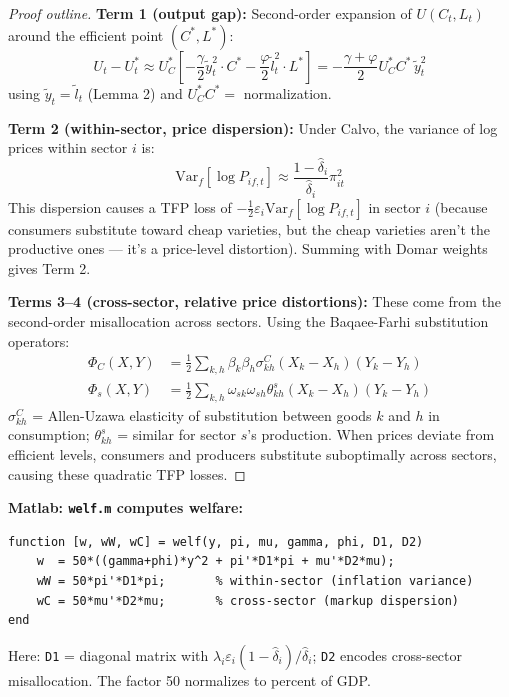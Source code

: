 \documentclass[12pt]{article}
\begin{document}
\begin{proof}[Proof outline]
\textbf{Term 1 (output gap):} Second-order expansion of $U(C_t, L_t)$ around the efficient point $(C^*, L^*)$:
\begin{equation}
    U_t - U_t^* \approx U_C^* \left[-\frac{\gamma}{2}\tilde{y}_t^2 \cdot C^* - \frac{\varphi}{2}\tilde{l}_t^2 \cdot L^*\right] = -\frac{\gamma+\varphi}{2}U_C^* C^*\,\tilde{y}_t^2
\end{equation}
using $\tilde{y}_t = \tilde{l}_t$ (Lemma 2) and $U_C^*C^* = $ normalization.

\textbf{Term 2 (within-sector, price dispersion):} Under Calvo, the variance of log prices within sector $i$ is:
\begin{equation}
    \mathrm{Var}_f[\log P_{if,t}] \approx \frac{1-\hat{\delta}_i}{\hat{\delta}_i}\pi_{it}^2
\end{equation}
This dispersion causes a TFP loss of $-\frac{1}{2}\varepsilon_i \mathrm{Var}_f[\log P_{if,t}]$ in sector $i$ (because consumers substitute toward cheap varieties, but the cheap varieties aren't the productive ones — it's a price-level distortion). Summing with Domar weights gives Term 2.

\textbf{Terms 3--4 (cross-sector, relative price distortions):} These come from the second-order misallocation across sectors. Using the Baqaee-Farhi substitution operators:
\begin{align}
    \Phi_C(X,Y) &= \frac{1}{2}\sum_{k,h}\beta_k\beta_h\sigma_{kh}^C(X_k-X_h)(Y_k-Y_h) \\
    \Phi_s(X,Y) &= \frac{1}{2}\sum_{k,h}\omega_{sk}\omega_{sh}\theta_{kh}^s(X_k-X_h)(Y_k-Y_h)
\end{align}
$\sigma_{kh}^C$ = Allen-Uzawa elasticity of substitution between goods $k$ and $h$ in consumption; $\theta_{kh}^s$ = similar for sector $s$'s production. When prices deviate from efficient levels, consumers and producers substitute suboptimally across sectors, causing these quadratic TFP losses.
\end{proof}

\begin{codebox}
\textbf{Matlab: \texttt{welf.m} computes welfare:}
\begin{verbatim}
function [w, wW, wC] = welf(y, pi, mu, gamma, phi, D1, D2)
    w  = 50*((gamma+phi)*y^2 + pi'*D1*pi + mu'*D2*mu);
    wW = 50*pi'*D1*pi;       % within-sector (inflation variance)
    wC = 50*mu'*D2*mu;       % cross-sector (markup dispersion)
end
\end{verbatim}
Here: \texttt{D1} = diagonal matrix with $\lambda_i\varepsilon_i(1-\hat{\delta}_i)/\hat{\delta}_i$; \texttt{D2} encodes cross-sector misallocation. The factor 50 normalizes to percent of GDP.
\end{codebox}
\end{document}
